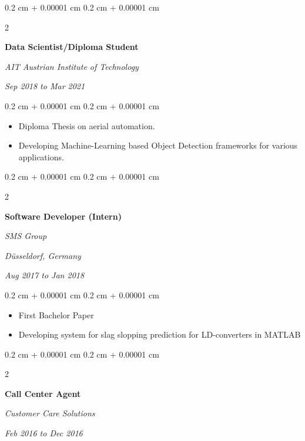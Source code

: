 \documentclass[10pt, letterpaper]{article}
\newenvironment{highlights}{
    \begin{itemize}[
        topsep=0.10 cm,
        parsep=0.10 cm,
        partopsep=0pt,
        itemsep=0pt,
        leftmargin=0.4 cm + 10pt
    ]
}{
    \end{itemize}
} %
\newenvironment{onecolentry}{
    \begin{adjustwidth}{
        0.2 cm + 0.00001 cm
    }{
        0.2 cm + 0.00001 cm
    }
}{
    \end{adjustwidth}
} %
\newenvironment{twocolentry}[2][]{
    \onecolentry
    \def\secondColumn{#2}
    \setcolumnwidth{\fill, 4.5 cm}
    \begin{paracol}{2}
}{
    \switchcolumn \raggedleft \secondColumn
    \end{paracol}
    \endonecolentry
} %
\begin{document}
        \vspace{0.2 cm}

        \begin{twocolentry}{
            
            
        \textit{Sep 2018 to Mar 2021}}
            \textbf{Data Scientist/Diploma Student}
            
            \textit{AIT Austrian Institute of Technology}
        \end{twocolentry}

        \vspace{0.10 cm}
        \begin{onecolentry}
            \begin{highlights}
                \item Diploma Thesis on aerial automation.
                \item Developing Machine-Learning based Object Detection frameworks for various applications.
            \end{highlights}
        \end{onecolentry}


        \vspace{0.2 cm}

        \begin{twocolentry}{
        \textit{Düsseldorf, Germany}    
            
        \textit{Aug 2017 to Jan 2018}}
            \textbf{Software Developer (Intern)}
            
            \textit{SMS Group}
        \end{twocolentry}

        \vspace{0.10 cm}
        \begin{onecolentry}
            \begin{highlights}
                \item First Bachelor Paper
                \item Developing system for slag slopping prediction for LD-converters in MATLAB
            \end{highlights}
        \end{onecolentry}


        \vspace{0.2 cm}

        \begin{twocolentry}{
            
            
        \textit{Feb 2016 to Dec 2016}}
            \textbf{Call Center Agent}
            
            \textit{Customer Care Solutions}
        \end{twocolentry}
\end{document}
